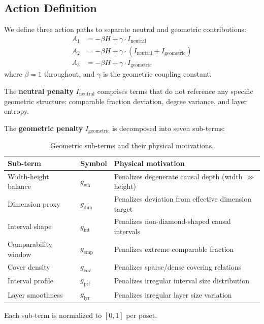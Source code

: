 \documentclass[11pt,a4paper]{article}
\begin{document}
\subsection{Action Definition}

We define three action paths to separate neutral and geometric contributions:
\begin{align}
    A_1 &= -\beta H + \gamma \cdot I_{\text{neutral}} \label{eq:A1} \\
    A_2 &= -\beta H + \gamma \cdot (I_{\text{neutral}} + I_{\text{geometric}}) \label{eq:A2} \\
    A_3 &= -\beta H + \gamma \cdot I_{\text{geometric}} \label{eq:A3}
\end{align}
where $\beta = 1$ throughout, and $\gamma$ is the geometric coupling constant.

The \textbf{neutral penalty} $I_{\text{neutral}}$ comprises terms that do not reference any specific geometric structure: comparable fraction deviation, degree variance, and layer entropy.

The \textbf{geometric penalty} $I_{\text{geometric}}$ is decomposed into seven sub-terms:

\begin{table}[H]
\centering
\caption{Geometric sub-terms and their physical motivations.}
\label{tab:subterms}
\begin{tabular}{lll}
\toprule
Sub-term & Symbol & Physical motivation \\
\midrule
Width-height balance & $g_{\text{wh}}$ & Penalizes degenerate causal depth (width $\gg$ height) \\
Dimension proxy & $g_{\text{dim}}$ & Penalizes deviation from effective dimension target \\
Interval shape & $g_{\text{int}}$ & Penalizes non-diamond-shaped causal intervals \\
Comparability window & $g_{\text{cmp}}$ & Penalizes extreme comparable fraction \\
Cover density & $g_{\text{cov}}$ & Penalizes sparse/dense covering relations \\
Interval profile & $g_{\text{prf}}$ & Penalizes irregular interval size distribution \\
Layer smoothness & $g_{\text{lyr}}$ & Penalizes irregular layer size variation \\
\bottomrule
\end{tabular}
\end{table}

Each sub-term is normalized to $[0, 1]$ per poset.
\end{document}
